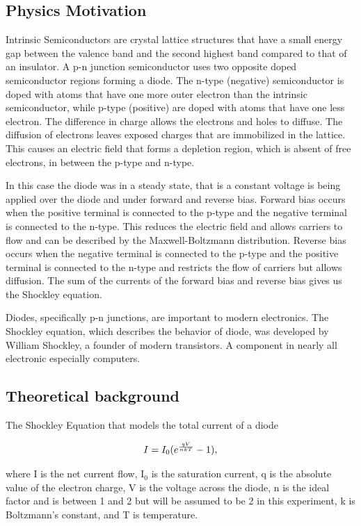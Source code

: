 \documentclass[11pt,letterpaper,onecolumn]{article}
\begin{document}
\subsection{Physics Motivation}

Intrinsic Semiconductors are crystal lattice structures that have a small energy gap between the valence band and the second highest band compared to that of an insulator. A p-n junction semiconductor uses two opposite doped semiconductor regions forming a diode. The n-type (negative) semiconductor is doped with atoms that have one more outer electron than the intrinsic semiconductor, while p-type (positive) are doped with atoms that have one less electron. The difference in charge allows the electrons and holes to diffuse. The diffusion of electrons leaves exposed charges that are immobilized in the lattice. This causes an electric field that forms a depletion region, which is absent of free electrons, in between the p-type and n-type.~\cite{Hons,Roh,Bart} 

In this case the diode was in a steady state, that is a constant voltage is being applied over the diode and under forward and reverse bias. Forward bias occurs when the positive terminal is connected to the p-type and the negative terminal is connected to the n-type. This reduces the electric field and allows carriers to flow and can be described by the Maxwell-Boltzmann distribution. Reverse bias occurs when the negative terminal is connected to the p-type and the positive terminal is connected to the n-type and restricts the flow of carriers but allows diffusion. The sum of the currents of the forward bias and reverse bias gives us the Shockley equation.~\cite{Roh}

Diodes, specifically p-n junctions, are important to modern electronics. The Shockley equation, which describes the behavior of diode, was developed by William Shockley, a founder of modern transistors. A component in nearly all electronic especially computers.

\subsection{Theoretical background}

The Shockley Equation that models the total current of a diode

{\Large$$I = I_0(e^\frac{qV}{nkT}-1){\normalsize,}$$}

where I is the net current flow, $\mathrm{I_0}$ is the saturation current, q is the absolute value of the electron charge, V is the voltage across the diode, n is the ideal factor and is between 1 and 2 but will be assumed to be 2 in this experiment, k is Boltzmann's constant, and T is temperature.
\end{document}
